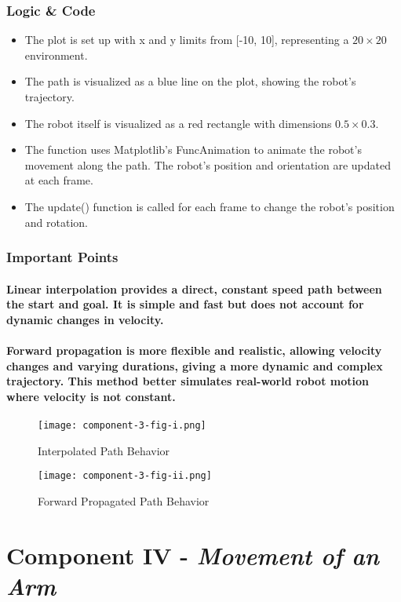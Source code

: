 \documentclass[12pt, letterpaper]{article}
\begin{document}
\subsubsection{Logic \& Code}
\begin{itemize}
    \item{The plot is set up with x and y limits from [-10, 10], representing a $20 \times 20$ environment.}
    \item{The path is visualized as a blue line on the plot, showing the robot's trajectory.}
    \item{The robot itself is visualized as a red rectangle with dimensions $0.5 \times 0.3$.}
    \item{The function uses Matplotlib's FuncAnimation to animate the robot's movement along the path. The robot's position and orientation are updated at each frame.}
    \item{The update() function is called for each frame to change the robot's position and rotation.}
\end{itemize}
\subsubsection{Important Points}
\paragraph{Linear interpolation provides a direct, constant speed path between the start and goal. It is simple and fast but does not account for dynamic changes in velocity.}
\paragraph{Forward propagation is more flexible and realistic, allowing velocity changes and varying durations, giving a more dynamic and complex trajectory. This method better simulates real-world robot motion where velocity is not constant.}
\begin{figure}
    \centering
    \texttt{[image: component-3-fig-i.png]}
    \caption{Interpolated Path Behavior}
    \label{fig:enter-label}
\end{figure}
\begin{figure}
    \centering
    \texttt{[image: component-3-fig-ii.png]}
    \caption{Forward Propagated Path Behavior}
    \label{fig:enter-label}
\end{figure}
\section{Component IV - \textit{Movement of an Arm}}
\end{document}
